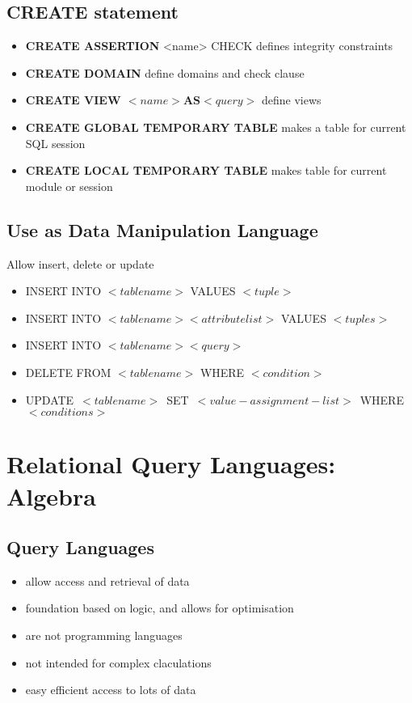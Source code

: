 \documentclass{article}
\begin{document}
	\subsection{CREATE statement}
		\begin{itemize}
			\item \textbf{CREATE ASSERTION} <name> CHECK defines integrity constraints
			\item \textbf{CREATE DOMAIN} define domains and check clause
			\item \textbf{CREATE VIEW $<name> \textbf{AS} <query>$} define views
			\item \textbf{CREATE GLOBAL TEMPORARY TABLE} makes a table for current SQL session
			\item \textbf{CREATE LOCAL TEMPORARY TABLE} makes table for current module or session
		\end{itemize}

	\subsection{Use as Data Manipulation Language}
		Allow insert, delete or update

		\begin{itemize}
			\item INSERT INTO $<tablename>$ VALUES $<tuple>$
			\item INSERT INTO $<tablename> <attributelist>$ VALUES $<tuples>$
			\item INSERT INTO $<tablename> <query>$
			\item DELETE FROM $<tablename>$ WHERE $<condition>$
			\item \mbox{UPDATE $<tablename>$ SET $<value-assignment-list>$ WHERE $<conditions>$}
		\end{itemize}

\section{Relational Query Languages: Algebra}
	\subsection{Query Languages}
		\begin{itemize}
			\item allow access and retrieval of data
			\item foundation based on logic, and allows for optimisation
			\item are not programming languages
			\item not intended for complex claculations
			\item easy efficient access to lots of data
		\end{itemize}
\end{document}
